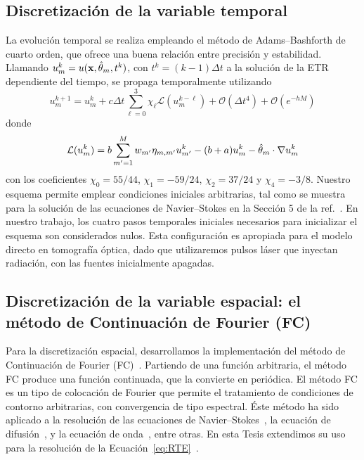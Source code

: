 \subsection{Discretización de la variable temporal}
\label{sec:adamsbashforth}
La evolución temporal se realiza empleando el método de Adams--Bashforth de cuarto orden, 
que ofrece una 
buena relación entre precisión y estabilidad.
Llamando $u_m^k=u(\mathbf{x},\hat{\theta}_m,t^k)$, con $t^{k}=(k-1)\Delta t$ a la solución 
de la ETR 
dependiente del tiempo, se propaga temporalmente utilizando
\begin{equation}
u_m^{k+1} =  u_m^k + c\Delta t \sum_{\ell=0}^3 \chi_{\ell} \mathcal{L} ( u^{k-\ell}_m)  
+\mathcal{O}(\Delta t^4)+\mathcal{O}(e^{-hM})
\label{eq:RTEAB4}
\end{equation}
donde
\begin{equation}
\mathcal{L} ( u_m^k) = b\sum_{m'=1}^{M} w_{m'} \eta_{m,m'} u_{m'}^k-(b+a)u_m^k-\hat{\theta}_m \cdot \nabla u_m^k \notag
\label{eq:RTEAB4L}
\end{equation}
con los coeficientes $\chi_0=55/44$, 
$\chi_1=-59/24$, $\chi_2=37/24$ y $\chi_4=-3/8$. 
Nuestro esquema permite emplear condiciones iniciales arbitrarias, tal como se muestra para  
la solución de las ecuaciones de Navier--Stokes en la Sección 5 de la ref.~\cite{Bruno2016}.
En nuestro trabajo, los cuatro pasos temporales iniciales necesarios para inicializar 
el esquema son considerados nulos. Esta configuración es 
apropiada para 
el modelo directo en tomografía óptica, dado que utilizaremos pulsos láser 
que inyectan radiación, con las fuentes inicialmente apagadas. 

\subsection{Discretización de la variable espacial: el método de Continuación de Fourier (FC)}
\label{sec:fcmethod}
Para la discretización espacial, desarrollamos la implementación 
del método de Continuación de Fourier (FC)~\cite{Bruno2010,Albin2011,Amlani2016}.  
Partiendo de una función arbitraria, el método FC produce 
una función continuada, que la convierte en periódica. 
El método FC es un tipo de colocación de Fourier que permite 
el tratamiento de condiciones de contorno arbitrarias, con 
convergencia de tipo espectral.
Éste método ha sido aplicado 
a la resolución de las ecuaciones de Navier--Stokes~\cite{Albin2011,Bruno2019}, la ecuación de difusión~\cite{Bruno2010}, 
y la ecuación de onda~\cite{Bruno2014}, entre otras. En esta Tesis extendimos su uso  
para la resolución de la Ecuación~\eqref{eq:RTE}~\cite{Gaggioli2019}.

